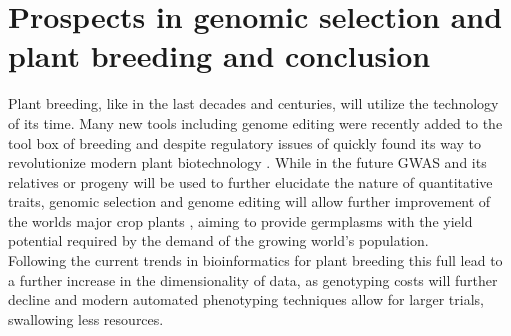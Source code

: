\section{Prospects in genomic selection and plant breeding and conclusion}
Plant breeding, like in the last decades and centuries, will utilize the technology of its
time. Many new tools including genome editing were recently added to the tool box of
breeding and despite regulatory issues of quickly found its way to revolutionize modern
plant biotechnology \cite{araki2015towards}. While in the future GWAS and its relatives or
progeny will be used to further elucidate the nature of quantitative traits, genomic
selection and genome editing will allow further improvement of the worlds major crop
plants \cite{rodriguez2017engineering}, aiming to provide germplasms with the yield
potential required by the demand of the growing world's population.\\
Following the current trends in bioinformatics for plant breeding this full lead to a
further increase in the dimensionality of data, as genotyping costs will further decline
and modern automated phenotyping techniques allow for larger trials, swallowing less
resources. 



         





